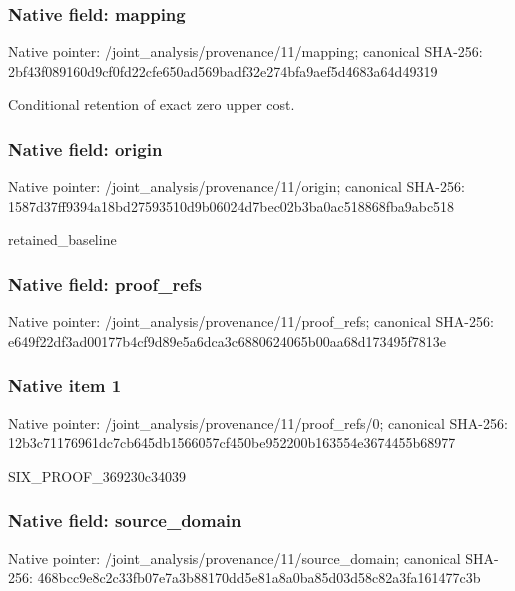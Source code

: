 \documentclass[10pt,a4paper]{article}
\begin{document}
\subsubsection{Native field: mapping}
Native pointer: /joint\_\allowbreak{}analysis/provenance/11/mapping; canonical SHA-256: 2bf43f089160d9cf0fd22cfe650ad569badf32e274bfa9aef5d4683a64d49319

\begingroup\raggedright\sloppy Conditional retention of exact zero upper cost.\par\endgroup

\subsubsection{Native field: origin}
Native pointer: /joint\_\allowbreak{}analysis/provenance/11/origin; canonical SHA-256: 1587d37ff9394a18bd27593510d9b06024d7bec02b3ba0ac518868fba9abc518

\begingroup\raggedright\sloppy retained\_\allowbreak{}baseline\par\endgroup

\subsubsection{Native field: proof\_\allowbreak{}refs}
Native pointer: /joint\_\allowbreak{}analysis/provenance/11/proof\_\allowbreak{}refs; canonical SHA-256: e649f22df3ad00177b4cf9d89e5a6dca3c6880624065b00aa68d173495f7813e

\subsubsection{Native item 1}
Native pointer: /joint\_\allowbreak{}analysis/provenance/11/proof\_\allowbreak{}refs/0; canonical SHA-256: 12b3c71176961dc7cb645db1566057cf450be952200b163554e3674455b68977

\begingroup\raggedright\sloppy SIX\_\allowbreak{}PROOF\_\allowbreak{}369230c34039\par\endgroup

\subsubsection{Native field: source\_\allowbreak{}domain}
Native pointer: /joint\_\allowbreak{}analysis/provenance/11/source\_\allowbreak{}domain; canonical SHA-256: 468bcc9e8c2c33fb07e7a3b88170dd5e81a8a0ba85d03d58c82a3fa161477c3b
\end{document}
